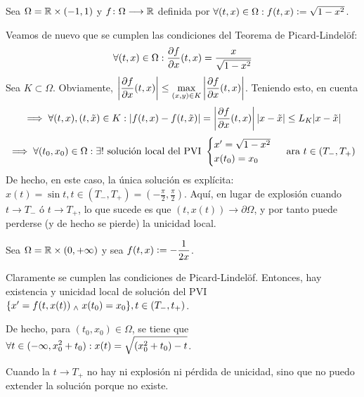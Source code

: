 \begin{ejem}
	Sea $\Omega = \mathbb{R} \times (-1,1)$ y $f \colon \Omega \longrightarrow \mathbb{R}$ definida por $\forall (t,x) \in \Omega : f(t,x)\vcentcolon= \sqrt{1-x^2} $.

	Veamos de nuevo que se cumplen las condiciones del Teorema de Picard-Lindelöf: \[\forall (t,x) \in \Omega : \pdv{f}{x}(t,x)=\frac{x}{\sqrt{1-x^2}}\]
	Sea $K \subset \Omega$. Obviamente, $\displaystyle \left |\frac{\partial f }{\partial x}(t,x) \right | \leq \displaystyle \max_{(x,y)\in K} \left |\frac{\partial f }{\partial x}(t,x) \right |$.
	Teniendo esto, en cuenta
	\[\implies \forall (t,x) , (t,\Tilde{x}) \in K : |f(t,x)-f(t,\Tilde{x})| = \left |\frac{\partial f }{\partial x}(t,x) \right | |x-\Tilde{x}| \leq L_K |x-\Tilde{x}| \]
	\[\implies \forall (t_0,x_0)\in \Omega : \exists ! \text{ solución local del PVI } \begin{cases}x'=\sqrt{1-x^2} \\ x(t_0)=x_0 \end{cases}\text{ ara } t \in (T_-,T_+)\]
	De hecho, en este caso, la única solución es explícita: $x(t)=\sin t, t \in (T_-,T_+)=\left ( - \frac{\pi}{2}, \frac{\pi}{2} \right )$.
% 
	Aquí, en lugar de explosión cuando $t \to T_-$ ó $t \to T_+$, lo que sucede es que $(t,x(t)) \to \partial \Omega$, y por tanto puede perderse (y de hecho se pierde) la unicidad local.
\end{ejem}

\begin{ejem}
	Sea $\Omega = \mathbb{R} \times (0, + \infty)$ y sea $\displaystyle f(t,x) \vcentcolon= - \frac{1}{2x}$.
	
	Claramente se cumplen las condiciones de Picard-Lindelöf. Entonces, hay existencia y unicidad local de solución del PVI $\{ x'=f(t,x(t)) \; _{\wedge} \; x(t_0)=x_0 \}, t \in (T_-,t_+)$.
	
	De hecho, para $(t_0,x_0)\in \Omega$, se tiene que $\displaystyle \forall t \in (-\infty , x_0^2 + t_0) : x(t)=\sqrt{(x_0^2+t_0)-t}$.

	Cuando la $t \to T_+$ no hay ni explosión ni pérdida de unicidad, sino que no puedo extender la solución porque no existe.
\end{ejem}


